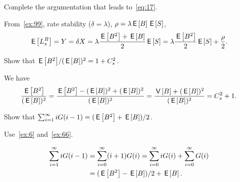 \begin{exercise}\label{ex:100}
Complete the argumentation that leads to~\cref{eq:17}.
\begin{solution}
  From~\cref{ex:99}, rate stability ($\delta = \lambda$), $\rho=\lambda \,\mathsf{E}\left[B\right] \,\mathsf{E}\left[S\right]$,
  \begin{equation*}
    \,\mathsf{E}\left[L_s^B\right] = Y = \delta X = \lambda \frac{\,\mathsf{E}\left[B^2\right]+\,\mathsf{E}\left[B\right]}2 \,\mathsf{E}\left[S\right] =  \lambda \frac{\,\mathsf{E}\left[B^2\right]}{2} \,\mathsf{E}\left[S\right] + \frac \rho 2.
  \end{equation*}
\end{solution}
\end{exercise}


\begin{exercise}\label{q:batch}
Show that ${\,\mathsf{E}\left[B^2\right]}/{(\,\mathsf{E}\left[B\right])^2} = 1+C_s^2$.
\begin{solution}
We have
\begin{align*}
\frac{\,\mathsf{E}\left[B^2\right]}{(\,\mathsf{E}\left[B\right])^2}
  =\frac{\,\mathsf{E}\left[B^2\right]-(\,\mathsf{E}\left[B\right])^2 + (\,\mathsf{E}\left[B\right])^2}{(\,\mathsf{E}\left[B\right])^2} 
= \frac{\,\mathsf{V}\left[B\right] + (\,\mathsf{E}\left[B\right])^2}{(\,\mathsf{E}\left[B\right])^2}= C_s^2+1.
\end{align*}
\end{solution}
\end{exercise}



\begin{exercise}\label{ex:ER}
 Show that $\sum_{i=1}^\infty i G(i-1)= ({\,\mathsf{E}\left[B^2\right] + \,\mathsf{E}\left[B\right]})/{2}$.
\begin{hint}
 Use~\cref{ex:6} and~\cref{ex:66}.
\end{hint}
\begin{solution}
\begin{equation*}
 \begin{split}
 \sum_{i=1}^\infty i G(i-1) 
&=\sum_{i=0}^\infty (i+1) G(i) 
=\sum_{i=0}^\infty i G(i) +
\sum_{i=0}^\infty G(i)\\
&= (\,\mathsf{E}\left[B^2\right] - \,\mathsf{E}\left[B\right])/2 + \,\mathsf{E}\left[B\right].
 \end{split}
\end{equation*}
\end{solution}
\end{exercise}





